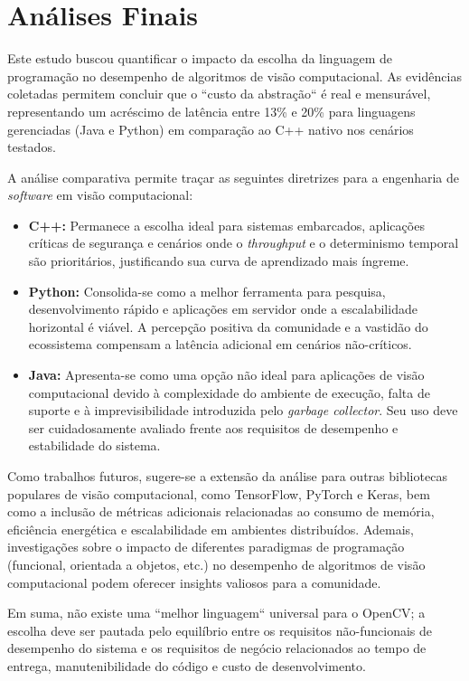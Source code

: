 \section{Análises Finais}

Este estudo buscou quantificar o impacto da escolha da linguagem de programação no desempenho de algoritmos de visão computacional. As evidências coletadas permitem concluir que o ``custo da abstração`` é real e mensurável, representando um acréscimo de latência entre 13\% e 20\% para linguagens gerenciadas (Java e Python) em comparação ao C++ nativo nos cenários testados.

A análise comparativa permite traçar as seguintes diretrizes para a engenharia de \textit{software} em visão computacional:

\begin{itemize}
    \item \textbf{C++:} Permanece a escolha ideal para sistemas embarcados, aplicações críticas de segurança e cenários onde o \textit{throughput} e o determinismo temporal são prioritários, justificando sua curva de aprendizado mais íngreme.
    
    \item \textbf{Python:} Consolida-se como a melhor ferramenta para pesquisa, desenvolvimento rápido e aplicações em servidor onde a escalabilidade horizontal é viável. A percepção positiva da comunidade e a vastidão do ecossistema compensam a latência adicional em cenários não-críticos.
    
    \item \textbf{Java:} Apresenta-se como uma opção não ideal para aplicações de visão computacional devido à complexidade do ambiente de execução, falta de suporte e à imprevisibilidade introduzida pelo \textit{garbage collector}. Seu uso deve ser cuidadosamente avaliado frente aos requisitos de desempenho e estabilidade do sistema.
\end{itemize}

Como trabalhos futuros, sugere-se a extensão da análise para outras bibliotecas populares de visão computacional, como TensorFlow, PyTorch e Keras, bem como a inclusão de métricas adicionais relacionadas ao consumo de memória, eficiência energética e escalabilidade em ambientes distribuídos. Ademais, investigações sobre o impacto de diferentes paradigmas de programação (funcional, orientada a objetos, etc.) no desempenho de algoritmos de visão computacional podem oferecer insights valiosos para a comunidade.

Em suma, não existe uma ``melhor linguagem`` universal para o OpenCV; a escolha deve ser pautada pelo equilíbrio entre os requisitos não-funcionais de desempenho do sistema e os requisitos de negócio relacionados ao tempo de entrega, manutenibilidade do código e custo de desenvolvimento.